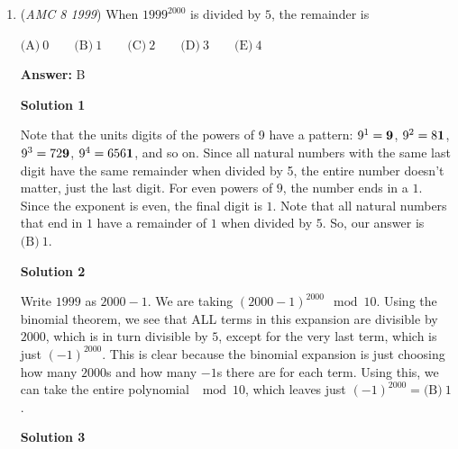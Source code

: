 \begin{enumerate}
 Thus, height $BM = 2$.

 Since $\triangle CBM$ is a right triangle, $CM = \sqrt{BM^2 + BC^2} = \sqrt{2^2 + 3^2} = \boxed{\text{(C)}\ \sqrt{13}}$.

 


 



\textbf{Solution 2}

Connect $AC$, $S_\triangle AMC=S_\triangle ANC$. To satisfied the three area is equal, we have $2S_\triangle AMC=S_\triangle BMC$, $2S_\triangle ANC=S_\triangle DNC$. Thus, $AM=AN=\frac{1}{2}BM=\frac{1}{2}ND=1$. $BM=2,BC=3,MC=\boxed{\text{(C)}\ \sqrt{13}}$.

 


	\item (\textit{AMC 8 1999}) When $1999^{2000}$ is divided by $5$, the remainder is 


 $\text{(A)}\ 0 \qquad \text{(B)}\ 1 \qquad \text{(C)}\ 2 \qquad \text{(D)}\ 3 \qquad \text{(E)}\ 4$

 \textbf{Answer: }B



\textbf{Solution 1}

Note that the units digits of the powers of 9 have a pattern: $9^1 = {\textbf 9}$, $9^2 = 8{\textbf 1}$, $9^3 = 72{\textbf 9}$, $9^4 = 656{\textbf 1}$, and so on. Since all natural numbers with the same last digit have the same remainder when divided by 5, the entire number doesn't matter, just the last digit. For even powers of $9$, the number ends in a $1$. Since the exponent is even, the final digit is $1$. Note that all natural numbers that end in $1$ have a remainder of $1$ when divided by $5$. So, our answer is $\boxed{\text{(B)}\ 1}$.

 



\textbf{Solution 2}

Write $1999$ as $2000-1$. We are taking $(2000-1)^{2000} \mod{10}$. Using the binomial theorem, we see that ALL terms in this expansion are divisible by $2000$, which is in turn divisible by $5$, except for the very last term, which is just $(-1)^{2000}$. This is clear because the binomial expansion is just choosing how many $2000$s and how many $-1$s there are for each term. Using this, we can take the entire polynomial $\mod{10}$, which leaves just $(-1)^{2000}=\boxed{\text{(B)}\ 1}$.

 



\textbf{Solution 3}


\end{enumerate}
